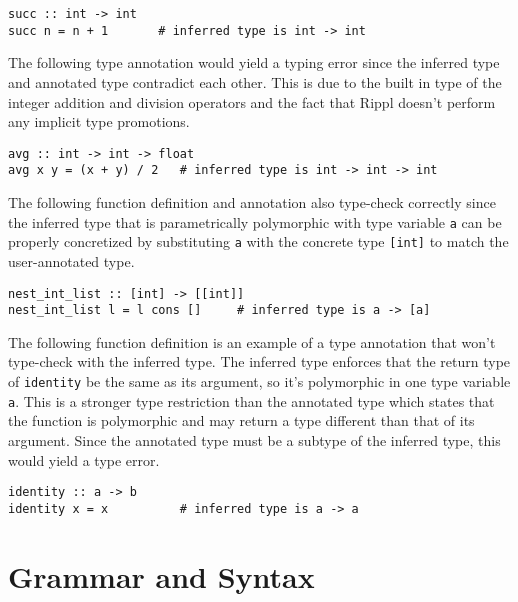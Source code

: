\documentclass[5pt]{article}
\begin{document}
\begin{lstlisting}[language=rippl]
succ :: int -> int
succ n = n + 1       # inferred type is int -> int
\end{lstlisting}

\noindent The following type annotation would yield a typing error since the inferred type and annotated type contradict each other. This is due to the built in type of the integer addition and division operators and the fact that Rippl doesn't perform any implicit type promotions. \\

\begin{lstlisting}[language=rippl]
avg :: int -> int -> float
avg x y = (x + y) / 2   # inferred type is int -> int -> int
\end{lstlisting}

\noindent The following function definition and annotation also type-check correctly since the inferred type that is parametrically polymorphic with type variable \texttt{a} can be properly concretized by substituting \texttt{a} with the concrete type \texttt{[int]} to match the user-annotated type. \\

\begin{lstlisting}[language=rippl]
nest_int_list :: [int] -> [[int]]
nest_int_list l = l cons []     # inferred type is a -> [a]
\end{lstlisting}

\noindent The following function definition is an example of a type annotation that won't type-check with the inferred type. The inferred type enforces that the return type of \texttt{identity} be the same as its argument, so it's polymorphic in one type variable \texttt{a}. This is a stronger type restriction than the annotated type which states that the function is polymorphic and may return a type different than that of its argument. Since the annotated type must be a subtype of the inferred type, this would yield a type error. \\

\begin{lstlisting}[language=rippl]
identity :: a -> b
identity x = x          # inferred type is a -> a
\end{lstlisting}
\pagebreak

\section{Grammar and Syntax}
\end{document}
